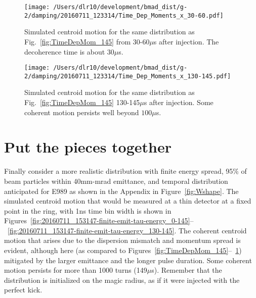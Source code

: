 \documentclass[10pt]{article}
\begin{document}
\begin{figure}[htbp] %
\begin{minipage}[t]{0.48\textwidth}
   \centering
   \texttt{[image: /Users/dlr10/development/bmad\_dist/g-2/damping/20160711\_123314/Time\_Dep\_Moments\_x\_30-60.pdf]} 
   \caption{Simulated centroid motion for the same distribution as Fig.~\ref{fig:TimeDepMom_145} from 30-60$\mu$s after injection. The
decoherence time is about $30\mu$s. \label{fig:TimeDepMom_30-60}}
 \end{minipage}
\hfill
\begin{minipage}[t]{0.48\textwidth}
\centering
   \texttt{[image: /Users/dlr10/development/bmad\_dist/g-2/damping/20160711\_123314/Time\_Dep\_Moments\_x\_130-145.pdf]} 
\caption{Simulated centroid motion for the same distribution as Fig.~\ref{fig:TimeDepMom_145} 130-145$\mu$s after injection. Some coherent motion persists well beyond $100\mu$s.
   \label{fig:TimeDepMom_130-145}}
\end{minipage}
\end{figure}

\newpage
\section{Put the pieces together}
Finally consider a more realistic distribution with finite energy spread, 95\% of beam particles within 40mm-mrad emittance, and temporal
distribution anticipated for E989\cite{w-shape} as shown in the Appendix in Figure~\ref{fig:Wshape}.%
The simulated centroid motion that would be measured at a thin detector at a fixed point in the ring, with 1ns time bin width
is shown in Figures~\ref{fig:20160711_153147-finite-emit-tau-energy_0-145}--~\ref{fig:20160711_153147-finite-emit-tau-energy_130-145}.
The coherent centroid motion that arises due to the dispersion mismatch and momentum spread is evident, although here (as compared to
Figures~\ref{fig:TimeDepMom_145}--~\ref{fig:TimeDepMom_130-145}) mitigated by the
larger emittance and the longer pulse duration. Some coherent motion persists for more than 1000 turns (149$\mu$s). Remember that
the distribution is initialized on the magic radius, as if it were injected with the perfect kick.
\end{document}

